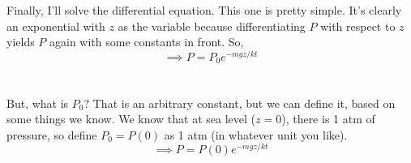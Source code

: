 \documentclass[12pt]{article}
\begin{document}
\begin{flushleft}
Finally, I'll solve the differential equation.
This one is pretty simple.
It's clearly an exponential with $z$ as the variable because differentiating $P$ with respect to $z$ yields $P$ again with some constants in front. So,
$$\implies P=P_0e^{-mgz/kt}$$\\~\\

But, what is $P_0$?
That is an arbitrary constant, but we can define it, based on some things we know.
We know that at sea level ($z=0$), there is 1 atm of pressure, so define $P_0=P(0)$ as 1 atm (in whatever unit you like).
$$\implies P=P(0)e^{-mgz/kt}$$\\~\\




\end{flushleft}
\end{document}
